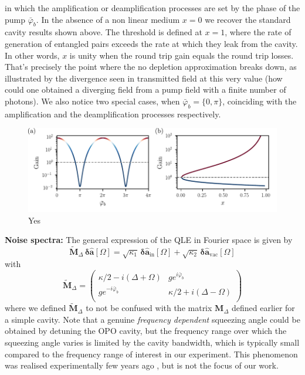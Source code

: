 in which the amplification or deamplification processes are set by the phase of the pump $\bar{\varphi}_b$. In the absence of a non linear medium $x=0$ we recover the standard cavity results shown above. The threshold is defined at $x=1$, where the rate of generation of entangled pairs exceeds the rate at which they leak from the cavity. In other words, $x$ is unity when the round trip gain equals the round trip losses. That's precisely the point where the no depletion approximation breaks down, as illustrated by the divergence seen in transmitted field at this very value (how could one obtained a diverging field from a pump field with a finite number of photons). We also notice two special cases, when $\bar\varphi_b=\{0,\pi\}$, coinciding with the amplification and the deamplification processes respectively. \\

\begin{figure}[h!]
\centering
\includegraphics[width=\textwidth]{./chap2/fig/amp_deamp.pdf}
\caption{Yes} 
\end{figure}

\noindent \textbf{Noise spectra: } The general expression of the QLE in Fourier space is given by 
\begin{equation}
  \tilde{\mathbf{M}}_\Delta \,  \mathbf{\delta \hat{a}}[\Omega]  = \sqrt{\kappa_{\mathrm{1}}} \, \mathbf{\delta \hat{a}_{\mathrm{in}}}[\Omega]  + \sqrt{\kappa_2} \, \mathbf{\delta \hat{a}_{\mathrm{vac}}}[\Omega]
\end{equation}
with
\begin{equation}
  \tilde{\mathbf{M}}_\Delta = \begin{pmatrix}
  \kappa/2-i(\Delta+\Omega) & g e^{i\bar{\varphi}_b}\\
   g e^{-i\bar{\varphi}_b} & \kappa/2+i(\Delta-\Omega) \\
  \end{pmatrix}
\end{equation}
where we defined $\tilde{\mathbf{M}}_\Delta$ to not be confused with the matrix $\mathbf{M}_\Delta$ defined earlier for a simple cavity.
Note that a genuine \textit{frequency dependent} squeezing angle could be obtained by detuning the OPO cavity, but the frequency range over which the squeezing angle varies is limited by the cavity bandwidth, which is typically small compared to the frequency range of interest in our experiment. This phenomenon was realised experimentally few years ago \cite{Vahlbruch2006}, but is not the focus of our work. \\

